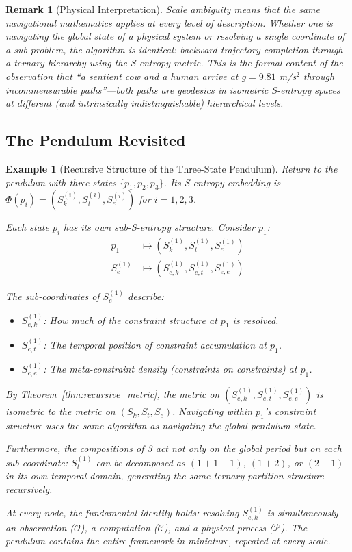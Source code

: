 \documentclass[12pt,twocolumn]{article}
\newtheorem{remark}{Remark}[section]
\newtheorem{example}{Example}[section]
\begin{document}
\begin{remark}[Physical Interpretation]
Scale ambiguity means that the same navigational mathematics applies at every level of description. Whether one is navigating the global state of a physical system or resolving a single coordinate of a sub-problem, the algorithm is identical: backward trajectory completion through a ternary hierarchy using the S-entropy metric. This is the formal content of the observation that ``a sentient cow and a human arrive at $g = 9.81$ m/s$^2$ through incommensurable paths''---both paths are geodesics in isometric S-entropy spaces at different (and intrinsically indistinguishable) hierarchical levels.
\end{remark}

\subsection{The Pendulum Revisited}

\begin{example}[Recursive Structure of the Three-State Pendulum]
\label{ex:pendulum_recursive}
Return to the pendulum with three states $\{p_1, p_2, p_3\}$. Its S-entropy embedding is $\Phi(p_i) = (S_k^{(i)}, S_t^{(i)}, S_e^{(i)})$ for $i = 1,2,3$.

Each state $p_i$ has its own sub-S-entropy structure. Consider $p_1$:
\begin{align}
p_1 &\mapsto (S_k^{(1)}, S_t^{(1)}, S_e^{(1)}) \\
S_e^{(1)} &\mapsto (S_{e,k}^{(1)}, S_{e,t}^{(1)}, S_{e,e}^{(1)})
\end{align}

The sub-coordinates of $S_e^{(1)}$ describe:
\begin{itemize}
\item $S_{e,k}^{(1)}$: How much of the constraint structure at $p_1$ is resolved.
\item $S_{e,t}^{(1)}$: The temporal position of constraint accumulation at $p_1$.
\item $S_{e,e}^{(1)}$: The meta-constraint density (constraints on constraints) at $p_1$.
\end{itemize}

By Theorem~\ref{thm:recursive_metric}, the metric on $(S_{e,k}^{(1)}, S_{e,t}^{(1)}, S_{e,e}^{(1)})$ is isometric to the metric on $(S_k, S_t, S_e)$. Navigating within $p_1$'s constraint structure uses the same algorithm as navigating the global pendulum state.

Furthermore, the compositions of 3 act not only on the global period but on each sub-coordinate: $S_t^{(1)}$ can be decomposed as $(1{+}1{+}1)$, $(1{+}2)$, or $(2{+}1)$ in its own temporal domain, generating the same ternary partition structure recursively.

At every node, the fundamental identity holds: resolving $S_{e,k}^{(1)}$ is simultaneously an observation ($\mathcal{O}$), a computation ($\mathcal{C}$), and a physical process ($\mathcal{P}$). The pendulum contains the entire framework in miniature, repeated at every scale.
\end{example}
\end{document}

